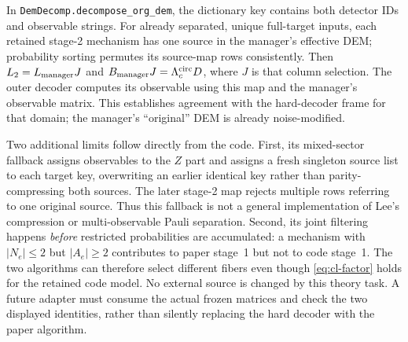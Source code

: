In \texttt{DemDecomp.decompose\_org\_dem}, the dictionary key contains
both detector IDs and observable strings. For already separated, unique
full-target inputs, each retained stage-2 mechanism has one source in the
manager's effective DEM; probability sorting permutes its source-map rows
consistently. Then $L_2=L_{\rm manager}J$ and
$B_{\rm manager}J=\Lambda_c^{\rm circ}D$, where $J$ is that column selection.
The outer decoder computes its observable using this map and the manager's
observable matrix. This establishes agreement with the hard-decoder frame
for that domain; the manager's ``original'' DEM is already noise-modified.

Two additional limits follow directly from the code. First, its
mixed-sector fallback assigns observables to the $Z$ part and assigns a
fresh singleton source list to each target key, overwriting an earlier
identical key rather than parity-compressing both sources. The later
stage-2 map rejects multiple rows referring to one original source.
Thus this fallback is not a general implementation of Lee's compression
or multi-observable Pauli separation. Second, its joint filtering happens
\emph{before} restricted probabilities are accumulated: a mechanism with
$|N_e|\le2$ but $|A_e|\ge2$ contributes to paper stage~1 but not to code
stage~1. The two algorithms can therefore select different fibers even
though \eqref{eq:cl-factor} holds for the retained code model.
No external source is changed by this theory task. A future adapter must
consume the actual frozen matrices and check the two displayed identities,
rather than silently replacing the hard decoder with the paper algorithm.

